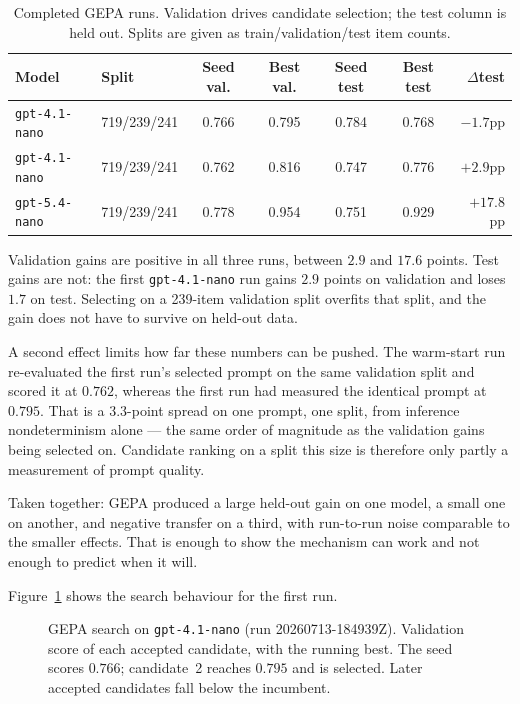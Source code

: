 \begin{table}[htbp]
    \centering
    \footnotesize
    \caption{Completed GEPA runs. Validation drives candidate selection; the test column is held out. Splits are given as train/validation/test item counts.}
    \label{tab:gepa-runs}
    \begin{tabular}{llccccr}
    \toprule
    Model & Split & Seed val. & Best val. & Seed test & Best test & $\Delta$test \\
    \midrule
    \texttt{gpt-4.1-nano} & 719/239/241 & 0.766 & 0.795 & 0.784 & 0.768 & $-1.7$pp \\
    \texttt{gpt-4.1-nano} & 719/239/241 & 0.762 & 0.816 & 0.747 & 0.776 & $+2.9$pp \\
    \texttt{gpt-5.4-nano} & 719/239/241 & 0.778 & 0.954 & 0.751 & 0.929 & $+17.8$pp \\
    \bottomrule
    \end{tabular}
\end{table}

Validation gains are positive in all three runs, between $2.9$ and $17.6$ points. Test gains are not: the first \texttt{gpt-4.1-nano} run gains $2.9$ points on validation and loses $1.7$ on test. Selecting on a 239-item validation split overfits that split, and the gain does not have to survive on held-out data.

A second effect limits how far these numbers can be pushed. The warm-start run re-evaluated the first run's selected prompt on the same validation split and scored it at $0.762$, whereas the first run had measured the identical prompt at $0.795$. That is a $3.3$-point spread on one prompt, one split, from inference nondeterminism alone --- the same order of magnitude as the validation gains being selected on. Candidate ranking on a split this size is therefore only partly a measurement of prompt quality.

Taken together: GEPA produced a large held-out gain on one model, a small one on another, and negative transfer on a third, with run-to-run noise comparable to the smaller effects. That is enough to show the mechanism can work and not enough to predict when it will.

Figure~\ref{fig:gepa-opt-curve} shows the search behaviour for the first run.

\begin{figure}[htbp]
    \centering
    
    \caption{GEPA search on \texttt{gpt-4.1-nano} (run 20260713-184939Z). Validation score of each accepted candidate, with the running best. The seed scores $0.766$; candidate~2 reaches $0.795$ and is selected. Later accepted candidates fall below the incumbent.}
    \label{fig:gepa-opt-curve}
\end{figure}

